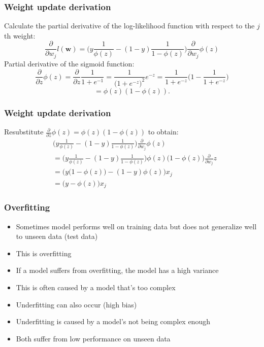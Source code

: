 \documentclass{beamer}
\begin{document}
\begin{frame}
  \frametitle{Weight update derivation}
  Calculate the partial derivative of the log-likelihood function with respect to the $j$th weight:
  \[
  \frac{\partial}{\partial w_j} l(\mathbf{w}) = \Bigg( y \frac{1}{\phi(z)}  - (1-y) \frac{1}{1-\phi(z)}   \Bigg)   \frac{\partial}{\partial w_j} \phi(z)
  \]
  Partial derivative of the sigmoid function:
  \[
  \frac{\partial}{\partial z} \phi(z) = \frac{\partial}{\partial z} \frac{1}{1 + e^{-1}} = \frac{1}{\big( 1 + e^{-z}\big)^2} e^{-z} = \frac{1}{1 + e^{-z}} \bigg( 1 - \frac{1}{1 + e^{-z}} \bigg)
  \]
  \[
  = \phi(z)(1-\phi(z)).
  \]
\end{frame}

\begin{frame}
  \frametitle{Weight update derivation}
  Resubstitute $\frac{\partial}{\partial z} \phi(z) = \phi(z)(1-\phi(z))$ to obtain:
  \begin{equation*}
  \begin{split}
    & \Bigg( y \frac{1}{\phi(z)} - (1-y) \frac{1}{1-\phi(z)} \Bigg) \frac{\partial}{\partial w_j} \phi(z) \\
    & = \Bigg( y \frac{1}{\phi(z)} - (1-y) \frac{1}{1-\phi(z)} \Bigg) \phi(z) \big(1 - \phi(z)\big) \frac{\partial}{\partial w_j} z \\
    & = \bigg(  y \big( 1 - \phi(z)   \big) - (1-y) \phi(z)  \bigg) x_j \\
    & = \big( y - \phi(z)  \big) x_j
  \end{split}
  \end{equation*}
\end{frame}

\begin{frame}
  \frametitle{Overfitting}
  \begin{itemize}
  \item Sometimes model performs well on training data but does not generalize well to unseen data (test data)
  \item This is overfitting
  \item If a model suffers from overfitting, the model has a high variance
  \item This is often caused by a model that's too complex
  \item Underfitting can also occur (high bias)
  \item Underfitting is caused by a model's not being complex enough
  \item Both suffer from low performance on unseen data
  \end{itemize}
\end{frame}
\end{document}
